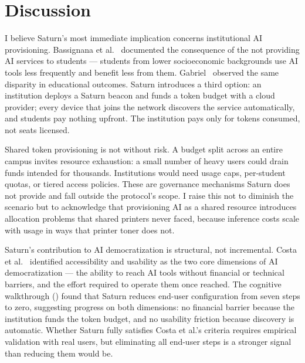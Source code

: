 \chapter{Discussion}
\label{ch:discussion}

I believe Saturn's most immediate implication concerns institutional AI provisioning.  Bassignana et al.~\cite{bassignana2025aigap} documented the consequence of the not providing AI services to students --- students from lower socioeconomic backgrounds use AI tools less frequently and benefit less from them. Gabriel~\cite{gabriel2024educational} observed the same disparity in educational outcomes. Saturn introduces a third option: an institution deploys a Saturn beacon and funds a token budget with a cloud provider; every device that joins the network discovers the service automatically, and students pay nothing upfront. The institution pays only for tokens consumed, not seats licensed.

Shared token provisioning is not without risk. A budget split across an entire campus invites resource exhaustion: a small number of heavy users could drain funds intended for thousands. Institutions would need usage caps, per-student quotas, or tiered access policies. These are governance mechanisms Saturn does not provide and fall outside the protocol's scope. I raise this not to diminish the scenario but to acknowledge that provisioning AI as a shared resource introduces allocation problems that shared printers never faced, because inference costs scale with usage in ways that printer toner does not.

Saturn's contribution to AI democratization is structural, not incremental. Costa et al.~\cite{costa2024democratization} identified accessibility and usability as the two core dimensions of AI democratization --- the ability to reach AI tools without financial or technical barriers, and the effort required to operate them once reached. The cognitive walkthrough () found that Saturn reduces end-user configuration from seven steps to zero, suggesting progress on both dimensions: no financial barrier because the institution funds the token budget, and no usability friction because discovery is automatic. Whether Saturn fully satisfies Costa et al.'s criteria requires empirical validation with real users, but eliminating all end-user steps is a stronger signal than reducing them would be.

